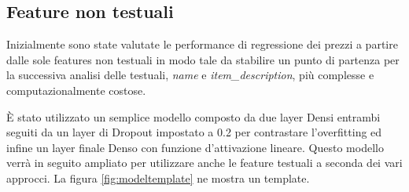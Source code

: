 



\subsection{Feature non testuali}

Inizialmente sono state valutate le performance di regressione dei prezzi a
partire dalle sole features non testuali in modo tale da stabilire un punto di
partenza per la successiva analisi delle testuali, \textit{name} e
\textit{item\_description}, più complesse e computazionalmente costose.

È stato utilizzato un semplice modello composto da due layer Densi entrambi
seguiti da un layer di Dropout impostato a 0.2 per contrastare l'overfitting ed
infine un layer finale Denso con funzione d'attivazione lineare.
Questo modello verrà in seguito ampliato per utilizzare anche le feature
testuali a seconda dei vari approcci.
La figura \ref{fig:modeltemplate} ne mostra un template.

